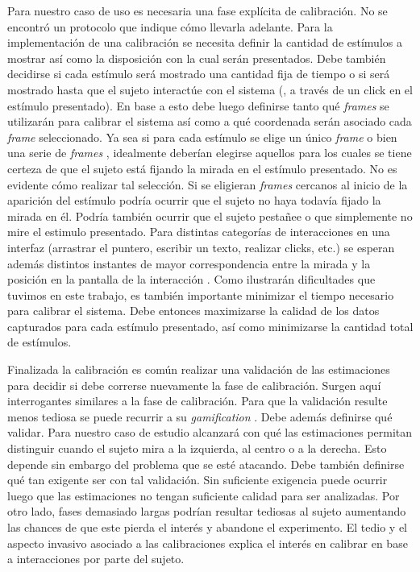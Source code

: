 Para nuestro caso de uso es necesaria una fase explícita de calibración.
No se encontró un protocolo que indique cómo llevarla adelante.
Para la implementación de una calibración se necesita definir la cantidad de
estímulos a mostrar así como la disposición con la cual serán presentados.
Debe también decidirse si cada estímulo será mostrado una cantidad fija de
tiempo o si será mostrado hasta que el sujeto interactúe con el sistema (\eg,
a través de un click en el estímulo presentado).
En base a esto debe luego definirse tanto qué \textit{frames} se utilizarán
para calibrar el sistema así como a qué coordenada serán asociado cada
\textit{frame} seleccionado.
Ya sea si para cada estímulo se elige un único \textit{frame}
\cite{papoutsaki_2016_webgazer} o bien una serie de \textit{frames}
\cite{xu_2015_turker_gaze}, idealmente deberían elegirse aquellos para los
cuales se tiene certeza de que el sujeto está fijando la mirada en el estímulo
presentado.
No es evidente cómo realizar tal selección.
Si se eligieran \textit{frames} cercanos al inicio de la aparición del
estímulo podría ocurrir que el sujeto no haya todavía fijado la mirada en él.
Podría también ocurrir que el sujeto pestañee o que simplemente no mire el
estimulo presentado.
Para distintas categorías de interacciones en una interfaz (arrastrar el
puntero, escribir un texto, realizar clicks, etc.) se esperan además distintos
instantes de mayor correspondencia entre la mirada y la posición en la pantalla
de la interacción \cite{huang_2016_pace}.
Como ilustrarán dificultades que tuvimos en este trabajo, es también importante
minimizar el tiempo necesario para calibrar el sistema.
Debe entonces maximizarse la calidad de los datos capturados para cada estímulo
presentado, así como minimizarse la cantidad total de estímulos.

Finalizada la calibración es común realizar una validación de las estimaciones
para decidir si debe correrse nuevamente la fase de calibración.
Surgen aquí interrogantes similares a la fase de calibración.
Para que la validación resulte menos tediosa se puede recurrir a su
\textit{gamification} \cite{xu_2015_turker_gaze}.
Debe además definirse qué validar.
Para nuestro caso de estudio alcanzará con qué las estimaciones permitan
distinguir cuando el sujeto mira a la izquierda, al centro o a la derecha.
Esto depende sin embargo del problema que se esté atacando.
Debe también definirse qué tan exigente ser con tal validación.
Sin suficiente exigencia puede ocurrir luego que las estimaciones no tengan
suficiente calidad para ser analizadas.
Por otro lado, fases demasiado largas podrían resultar tediosas al sujeto
aumentando las chances de que este pierda el interés y abandone el experimento.
El tedio y el aspecto invasivo asociado a las calibraciones explica el interés
en calibrar en base a interacciones por parte del sujeto.

